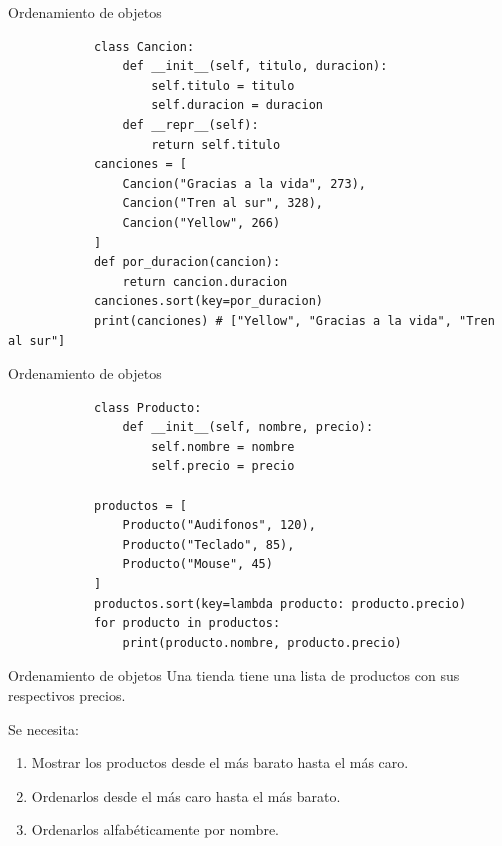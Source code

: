 \documentclass{beamer}
\begin{document}
    \begin{frame}[fragile, t]{Ordenamiento de objetos}
        \begin{verbatim}
            class Cancion:
                def __init__(self, titulo, duracion):
                    self.titulo = titulo
                    self.duracion = duracion
                def __repr__(self):
                    return self.titulo
            canciones = [
                Cancion("Gracias a la vida", 273),
                Cancion("Tren al sur", 328),
                Cancion("Yellow", 266)
            ]
            def por_duracion(cancion):
                return cancion.duracion
            canciones.sort(key=por_duracion)
            print(canciones) # ["Yellow", "Gracias a la vida", "Tren al sur"]
        \end{verbatim}
    \end{frame}

    \begin{frame}[fragile, t]{Ordenamiento de objetos}
        \begin{verbatim}
            class Producto:
                def __init__(self, nombre, precio):
                    self.nombre = nombre
                    self.precio = precio

            productos = [
                Producto("Audifonos", 120),
                Producto("Teclado", 85),
                Producto("Mouse", 45)
            ]
            productos.sort(key=lambda producto: producto.precio)
            for producto in productos:
                print(producto.nombre, producto.precio) 
        \end{verbatim}
    \end{frame}

    \begin{frame}[fragile, t]{Ordenamiento de objetos}
        Una tienda tiene una lista de productos con sus respectivos precios.

        Se necesita:
        \begin{enumerate}
            \item Mostrar los productos desde el más barato hasta el más caro.
            \item Ordenarlos desde el más caro hasta el más barato.
            \item Ordenarlos alfabéticamente por nombre.
        \end{enumerate}
    \end{frame}
\end{document}
